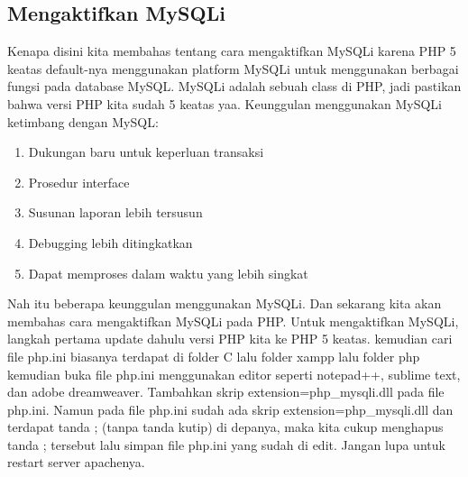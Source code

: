 \subsection{Mengaktifkan MySQLi}
Kenapa disini kita membahas tentang cara mengaktifkan MySQLi karena PHP 5 keatas default-nya menggunakan platform MySQLi untuk menggunakan berbagai fungsi pada database MySQL. MySQLi adalah sebuah class di PHP, jadi pastikan bahwa versi PHP kita sudah 5 keatas yaa.
Keunggulan menggunakan MySQLi ketimbang dengan MySQL:
\begin{enumerate}
\item Dukungan baru untuk keperluan transaksi
\item Prosedur interface
\item Susunan laporan lebih tersusun
\item Debugging lebih ditingkatkan
\item Dapat memproses dalam waktu yang lebih singkat
\end{enumerate}

Nah itu beberapa keunggulan menggunakan MySQLi. Dan sekarang kita akan membahas cara mengaktifkan MySQLi pada PHP.
Untuk mengaktifkan MySQLi, langkah pertama update dahulu versi PHP kita ke PHP 5 keatas. kemudian cari file php.ini biasanya terdapat di folder C lalu folder xampp lalu folder php kemudian buka file php.ini menggunakan editor seperti notepad++, sublime text, dan adobe dreamweaver. Tambahkan skrip extension=php\_mysqli.dll pada file php.ini. Namun pada file php.ini sudah ada skrip extension=php\_mysqli.dll dan terdapat tanda ; (tanpa tanda kutip) di depanya, maka kita cukup menghapus tanda ; tersebut lalu simpan file php.ini yang sudah di edit. Jangan lupa untuk restart server apachenya.


